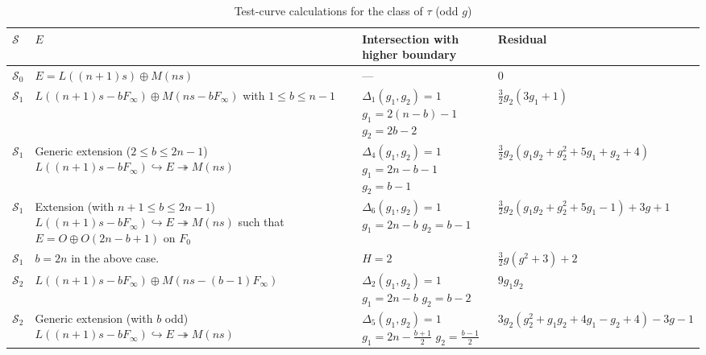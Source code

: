 \documentclass{amsart}
\newcommand{\into}{{\hookrightarrow}}
\newcommand{\onto}{\twoheadrightarrow}
\newcommand{\orb}[1]{{\mathcal #1}}     %
\begin{document}
\begin{longtable}{| l | p{} | p{} | p{} |}
\caption{Test-curve calculations for the class of $\tau$ (odd $g$)}\\
\hline
$\orb S$ & $E$ & Intersection with higher boundary & Residual\\
\hline
\endhead
\hline
\endfoot
$\orb S_0$ & 
$E = L((n+1)s) \oplus M(ns)$ & 
---&
$0$\\

$\orb S_1$ &
$L((n+1)s - bF_\infty)\oplus M(ns-bF_\infty)$ \newline
with $1 \leq b \leq n-1$ &
$\Delta_1(g_1,g_2) = 1$\newline
$g_1 = 2(n-b)-1$\newline
$g_2 = 2b - 2$ &
$\frac{3}{2}g_2(3g_1+1)$
\\

$\orb S_1$ &
Generic extension ($ 2 \leq b \leq 2n-1$)\newline
$L((n+1)s-bF_\infty) \into E \onto M(ns)$&
$\Delta_4(g_1,g_2) = 1$\newline
$g_1 = 2n-b-1$\newline
$g_2 = b-1$&
$\frac{3}{2}g_2(g_1g_2+g_2^2+5g_1+g_2+4)$
\\

$\orb S_1$ &
Extension (with $n+1 \leq b \leq 2n-1$)\newline
$L((n+1)s-bF_\infty) \into E \onto M(ns)$ \newline
such that $E = O \oplus O(2n-b+1)$ on $F_0$&
$\Delta_6(g_1,g_2) = 1$\newline
$g_1 = 2n-b$\newline
$g_2 = b-1$&
$\frac{3}{2}g_2(g_1g_2+g_2^2+5g_1-1) + 3g+1$
\\

$\orb S_1$ &
$b = 2n$ in the above case.
&
$H = 2$&
$\frac{3}{2}g(g^2+3)+2$

\\
$\orb S_2$ &
$L((n+1)s - bF_\infty) \oplus M(ns-(b-1)F_\infty)$ &
$\Delta_2(g_1,g_2) = 1$\newline
$g_1 = 2n-b$\newline
$g_2 = b - 2$ &
$9g_1g_2$
\\

$\orb S_2$ &
Generic extension (with $b$ odd)\newline
$L((n+1)s - bF_\infty) \into E \onto M(ns)$ &
$\Delta_5(g_1,g_2) = 1$\newline
$g_1 = 2n-\frac{b+1}{2}$\newline
$g_2= \frac{b-1}{2} $ &
$3g_2(g_2^2+g_1g_2+4g_1-g_2+4)-3g-1$
\\


\end{longtable}
\end{document}

